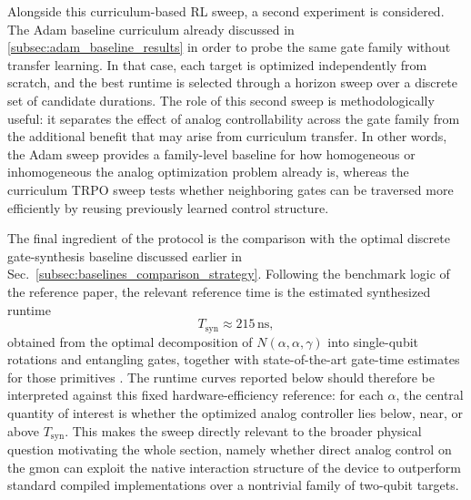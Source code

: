 Alongside this curriculum-based RL sweep, a second experiment is considered. The Adam baseline curriculum already discussed in \ref{subsec:adam_baseline_results} in order to
probe the same gate family without transfer learning. In that case, each target is optimized independently from
scratch, and the best runtime is selected through a horizon sweep over a discrete set of candidate durations. The role of this second sweep is methodologically useful: it separates
the effect of analog controllability across the gate family from the additional benefit that may arise from
curriculum transfer. In other words, the Adam sweep provides a family-level baseline for how
homogeneous or inhomogeneous the analog optimization problem already is, whereas the curriculum TRPO sweep tests
whether neighboring gates can be traversed more efficiently by reusing previously learned control structure.

The final ingredient of the protocol is the comparison with the optimal discrete gate-synthesis baseline discussed
earlier in Sec.~\ref{subsec:baselines_comparison_strategy}. Following the benchmark logic of the reference paper,
the relevant reference time is the estimated synthesized runtime
\begin{equation}
T_{\mathrm{syn}} \approx 215\,\mathrm{ns},
\label{eq:runtime_synthesis_baseline_recalled}
\end{equation}
obtained from the optimal decomposition of \(N(\alpha,\alpha,\gamma)\) into single-qubit rotations and entangling
gates, together with state-of-the-art gate-time estimates for those primitives \cite{Niu2019}. The runtime curves
reported below should therefore be interpreted against this fixed hardware-efficiency reference: for each
\(\alpha\), the central quantity of interest is whether the optimized analog controller lies below, near, or above
\(T_{\mathrm{syn}}\). This makes the sweep directly relevant to the broader physical question motivating the whole
section, namely whether direct analog control on the gmon can exploit the native interaction structure of the
device to outperform standard compiled implementations over a nontrivial family of two-qubit targets.

